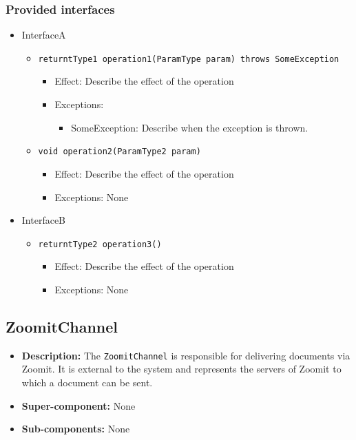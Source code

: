 \documentclass[a4paper,10pt]{article}
\begin{document}
\subsubsection*{Provided interfaces}
\begin{itemize}
    \item InterfaceA
    \begin{itemize}
        \item \texttt{returntType1 operation1(ParamType param) throws SomeException}
        \begin{itemize}
            \item Effect: Describe the effect of the operation
            \item Exceptions:
            \begin{itemize}
                \item SomeException: Describe when the exception is thrown.
            \end{itemize}
		\end{itemize}
        \item \texttt{void operation2(ParamType2 param)}
        \begin{itemize}
            \item Effect: Describe the effect of the operation
            \item Exceptions: None
        \end{itemize}
    \end{itemize}

    \item InterfaceB
    \begin{itemize}
        \item \texttt{returntType2 operation3()}
        \begin{itemize}
            \item Effect: Describe the effect of the operation
            \item Exceptions: None
        \end{itemize}
    \end{itemize}
\end{itemize}

\subsection{ZoomitChannel}
\begin{itemize}
    \item \textbf{Description:} The \texttt{ZoomitChannel} is responsible for delivering documents via Zoomit. It is external to the system and represents the servers of Zoomit to which a document can be sent.
    \item \textbf{Super-component:} None
    \item \textbf{Sub-components:} None
\end{itemize}
\end{document}
